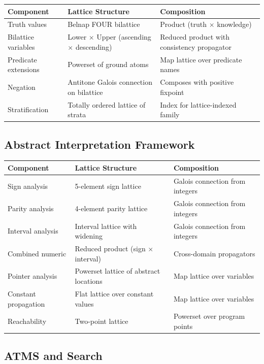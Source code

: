 \documentclass[11pt]{article}
\begin{document}
\begin{center}
\begin{tabular}{lll}
Component & Lattice Structure & Composition\\
\hline
Truth values & Belnap FOUR bilattice & Product (truth \(\times\) knowledge)\\
Bilattice variables & Lower \(\times\) Upper (ascending \(\times\) descending) & Reduced product with consistency propagator\\
Predicate extensions & Powerset of ground atoms & Map lattice over predicate names\\
Negation & Antitone Galois connection on bilattice & Composes with positive fixpoint\\
Stratification & Totally ordered lattice of strata & Index for lattice-indexed family\\
\end{tabular}
\end{center}
\subsection{Abstract Interpretation Framework}
\label{sec:org36c24f9}

\begin{center}
\begin{tabular}{lll}
Component & Lattice Structure & Composition\\
\hline
Sign analysis & 5-element sign lattice & Galois connection from integers\\
Parity analysis & 4-element parity lattice & Galois connection from integers\\
Interval analysis & Interval lattice with widening & Galois connection from integers\\
Combined numeric & Reduced product (sign \(\times\) interval) & Cross-domain propagators\\
Pointer analysis & Powerset lattice of abstract locations & Map lattice over variables\\
Constant propagation & Flat lattice over constant values & Map lattice over variables\\
Reachability & Two-point lattice & Powerset over program points\\
\end{tabular}
\end{center}
\subsection{ATMS and Search}
\label{sec:org38dd8be}
\end{document}

